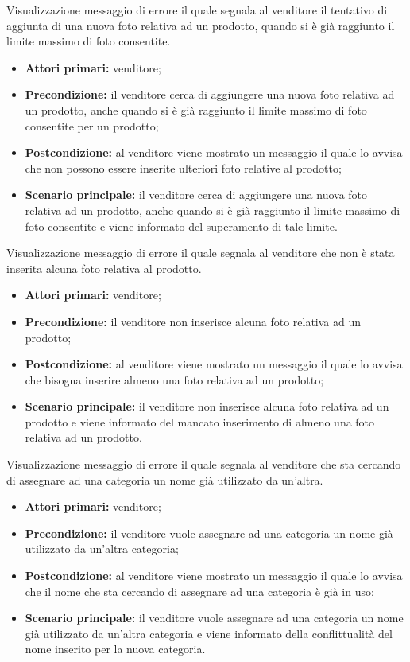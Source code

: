 Visualizzazione messaggio di errore il quale segnala al venditore il tentativo di aggiunta di una nuova foto relativa ad un prodotto, quando si è già raggiunto il limite massimo di foto consentite.
\begin{itemize}
    \item \textbf{Attori primari:} venditore;
    \item \textbf{Precondizione:} il venditore cerca di aggiungere una nuova foto relativa ad un prodotto, anche quando si è già raggiunto il limite massimo di foto consentite per un prodotto;
    \item \textbf{Postcondizione:} al venditore viene mostrato un messaggio il quale lo avvisa che non possono essere inserite ulteriori foto relative al prodotto;
    \item \textbf{Scenario principale:} il venditore cerca di aggiungere una nuova foto relativa ad un prodotto, anche quando si è già raggiunto il limite massimo di foto consentite e viene informato del superamento di tale limite.
\end{itemize}

Visualizzazione messaggio di errore il quale segnala al venditore che non è stata inserita alcuna foto relativa al prodotto.
\begin{itemize}
    \item \textbf{Attori primari:} venditore;
    \item \textbf{Precondizione:} il venditore non inserisce alcuna foto relativa ad un prodotto;
    \item \textbf{Postcondizione:} al venditore viene mostrato un messaggio il quale lo avvisa che bisogna inserire almeno una foto relativa ad un prodotto;
    \item \textbf{Scenario principale:} il venditore non inserisce alcuna foto relativa ad un prodotto e viene informato del mancato inserimento di almeno una foto relativa ad un prodotto.
\end{itemize}

Visualizzazione messaggio di errore il quale segnala al venditore che sta cercando di assegnare ad una categoria un nome già utilizzato da un'altra.
\begin{itemize}
    \item \textbf{Attori primari:} venditore;
    \item \textbf{Precondizione:} il venditore vuole assegnare ad una categoria un nome già utilizzato da un'altra categoria;
    \item \textbf{Postcondizione:} al venditore viene mostrato un messaggio il quale lo avvisa che il nome che sta cercando di assegnare ad una categoria è già in uso;
    \item \textbf{Scenario principale:} il venditore vuole assegnare ad una categoria un nome già utilizzato da un'altra categoria e viene informato della conflittualità del nome inserito per la nuova categoria.
\end{itemize}

